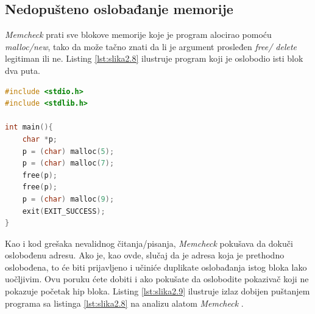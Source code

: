 \documentclass[12pt,oneside]{memoir}
\theoremstyle{plain}
\theoremstyle{definition}
\begin{document}
\subsection{Nedopušteno oslobađanje memorije}
\textit{Memcheck} prati sve blokove memorije koje je program alocirao pomoću \textit{malloc/new}, tako da može tačno znati da li je argument prosleđen \textit{free/ delete} legitiman ili ne. Listing \ref{lst:slika2.8} ilustruje program koji je oslobodio isti blok dva puta. 

\begin{lstlisting}[style=mystyle,caption={Program koji oslobađa isti blok dva puta}, label={lst:slika2.8},language={C}] 
#include <stdio.h>
#include <stdlib.h>

int main(){
	char *p;
	p = (char) malloc(5);
	p = (char) malloc(7);
	free(p);
	free(p);
	p = (char) malloc(9);
	exit(EXIT_SUCCESS);
}
\end{lstlisting}


Kao i kod grešaka nevalidnog čitanja/pisanja, \textit{Memcheck} pokušava da dokuči oslobođenu adresu. Ako je, kao ovde, slučaj da je adresa koja je prethodno oslobođena, to će biti prijavljeno i učiniće duplikate oslobađanja istog bloka lako uočljivim. Ovu poruku ćete dobiti i ako pokušate da oslobodite pokazivač koji ne pokazuje početak hip bloka. Listing \ref{lst:slika2.9} ilustruje izlaz dobijen puštanjem programa sa listinga \ref{lst:slika2.8} na analizu alatom \textit{Memcheck} \cite{Memcheck}. 

\end{document}
